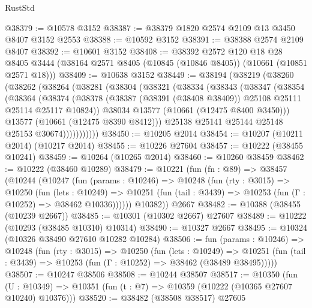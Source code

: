 \begin{lexlean}{RustStd}
\begin{coremodule}
@38379 := @10578 @3152
@38387 := @38379 @1820 @2574 @2109 @13 @3450 @8407 @3152 @2553
@38388 := @10592 @3152
@38391 := @38388 @2574 @2109 @8407
@38392 := @10601 @3152
@38408 := @38392
    @2572
    @120
    @18
    @28
    @8405
    @3444
    (@38164 @2571 @8405 (@10845 (@10846 @8405)) (@10661 (@10851 @2571 @18)))
@38409 := @10638 @3152
@38449 := @38194
    (@38219
      (@38260
        (@38262
          (@38264
            (@38281
              (@38304
                (@38321
                  (@38334
                    (@38343
                      (@38347
                        (@38354
                          (@38364
                            (@38374
                              (@38378
                                (@38387
                                  (@38391 (@38408 @38409))
                                  @25108
                                  @25111
                                  @25114
                                  @25117
                                  @10824))
                              @38034
                              @13577
                              (@10661 (@12475 @8400 @3450)))
                            @13577
                            (@10661 (@12475 @8390 @8412)))
                          @25138
                          @25141
                          @25144
                          @25148
                          @25153
                          @30674)))))))))))
@38450 := @10205 @2014
@38454 := @10207 (@10211 @2014) (@10217 @2014)
@38455 := @10226 @27604
@38457 := @10222 (@38455 @10241)
@38459 := @10264 (@10265 @2014)
@38460 := @10260 @38459
@38462 := @10222 (@38460 @10289)
@38479 := @10221
    (fun (fn : @89) =>
    @38457
      (@10244
        (@10247
          (fun (params : @10246) =>
          @10248
            (fun (rty : @3015) =>
            @10250
              (fun (lets : @10249) =>
              @10251 (fun (tail : @3439) => @10253 (fun (Γ : @10252) => @38462 @10336))))))
        @10382))
    @2667
@38482 := @10388 (@38455 (@10239 @2667))
@38485 := @10301 (@10302 @2667) @27607
@38489 := @10222 (@10293 (@38485 @10310) @10314)
@38490 := @10327 @2667
@38495 := @10324 (@10326 @38490 @27610 @10282 @10284)
@38506 := fun (params : @10246) =>
  @10248
    (fun (rty : @3015) =>
    @10250
      (fun (lets : @10249) =>
      @10251 (fun (tail : @3439) => @10253 (fun (Γ : @10252) => @38462 (@38489 @38495)))))
@38507 := @10247 @38506
@38508 := @10244 @38507
@38517 := @10350
    (fun (U : @10349) => @10351 (fun (t : @7) => @10359 (@10222 (@10365 @27607 @10240) @10376)))
@38520 := @38482 (@38508 @38517) @27605

\end{coremodule}
\end{lexlean}
